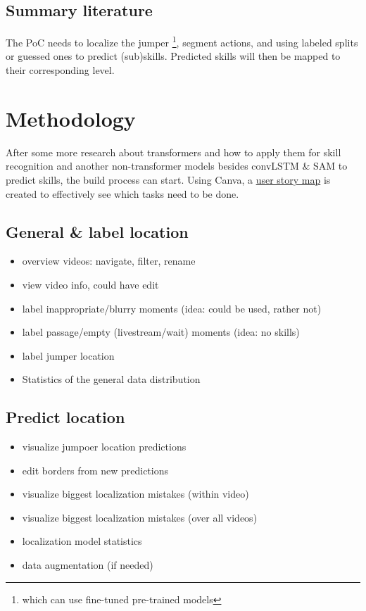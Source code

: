 \subsection{Summary literature}
\label{proposal-subsec:summary literature}

The PoC needs to localize the jumper \footnote{which can use fine-tuned pre-trained models}, segment actions, and using labeled splits or guessed ones to predict (sub)skills.
Predicted skills will then be mapped to their corresponding level.

\section{Methodology}%
\label{proposal-sec:methodoly}

After some more research about transformers and how to apply them for skill recognition and another non-transformer models besides convLSTM \& SAM to predict skills, the build process can start.
Using Canva, a \href{https://www.canva.com/design/DAGVz44QCgc/\_Mr9BrOqwwdy9cf-ieYFVg/edit?utm\_content=DAGVz44QCgc\&utm\_campaign=designshare\&utm\_medium=link2\&utm\_source=sharebutton}{user story map} is created to effectively see which tasks need to be done.

\subsection{General \& label location}

\begin{itemize}
    \item overview videos: navigate, filter, rename
    \item view video info, could have edit
    \item label inappropriate/blurry moments (idea: could be used, rather not)
    \item label passage/empty (livestream/wait) moments (idea: no skills)
    \item label jumper location
    \item Statistics of the general data distribution
\end{itemize}

\subsection{Predict location}

\begin{itemize}
    \item visualize jumpoer location predictions
    \item edit borders from new predictions
    \item visualize biggest localization mistakes (within video)
    \item visualize biggest localization mistakes (over all videos)
    \item localization model statistics
    \item data augmentation (if needed)
\end{itemize}

